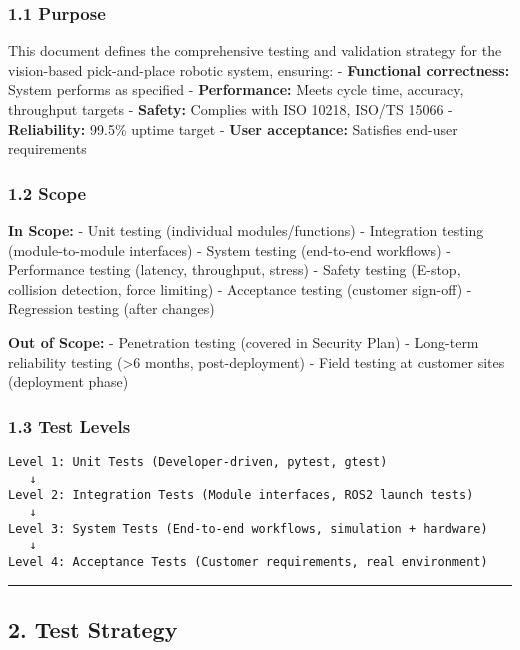 \documentclass[
]{article}
\begin{document}
\hypertarget{purpose}{%
\subsubsection{1.1 Purpose}\label{purpose}}

This document defines the comprehensive testing and validation strategy
for the vision-based pick-and-place robotic system, ensuring: -
\textbf{Functional correctness:} System performs as specified -
\textbf{Performance:} Meets cycle time, accuracy, throughput targets -
\textbf{Safety:} Complies with ISO 10218, ISO/TS 15066 -
\textbf{Reliability:} 99.5\% uptime target - \textbf{User acceptance:}
Satisfies end-user requirements

\hypertarget{scope}{%
\subsubsection{1.2 Scope}\label{scope}}

\textbf{In Scope:} - Unit testing (individual modules/functions) -
Integration testing (module-to-module interfaces) - System testing
(end-to-end workflows) - Performance testing (latency, throughput,
stress) - Safety testing (E-stop, collision detection, force limiting) -
Acceptance testing (customer sign-off) - Regression testing (after
changes)

\textbf{Out of Scope:} - Penetration testing (covered in Security Plan)
- Long-term reliability testing (\textgreater6 months, post-deployment)
- Field testing at customer sites (deployment phase)

\hypertarget{test-levels}{%
\subsubsection{1.3 Test Levels}\label{test-levels}}

\begin{verbatim}
Level 1: Unit Tests (Developer-driven, pytest, gtest)
   ↓
Level 2: Integration Tests (Module interfaces, ROS2 launch tests)
   ↓
Level 3: System Tests (End-to-end workflows, simulation + hardware)
   ↓
Level 4: Acceptance Tests (Customer requirements, real environment)
\end{verbatim}

\begin{center}\rule{0.5\linewidth}{0.5pt}\end{center}

\hypertarget{test-strategy}{%
\subsection{2. Test Strategy}\label{test-strategy}}
\end{document}
